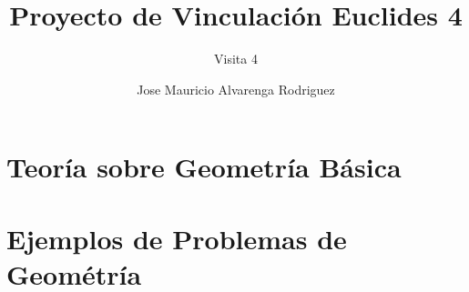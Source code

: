 \documentclass[9pt]{beamer}
\title{Proyecto de Vinculación Euclides 4
}
\subtitle{Visita 4}
\author{\inst{1}Jose Mauricio Alvarenga Rodriguez}
\institute{\inst{1} Universidad Nacional Autónoma de Honduras}
\begin{document}
\begin{frame}
\titlepage
\end{frame}
\section[Teoría Geometría]{Teoría sobre Geometría Básica}
\section[Ejemplos Geometría]{Ejemplos de Problemas de Geométría}

\end{document}
